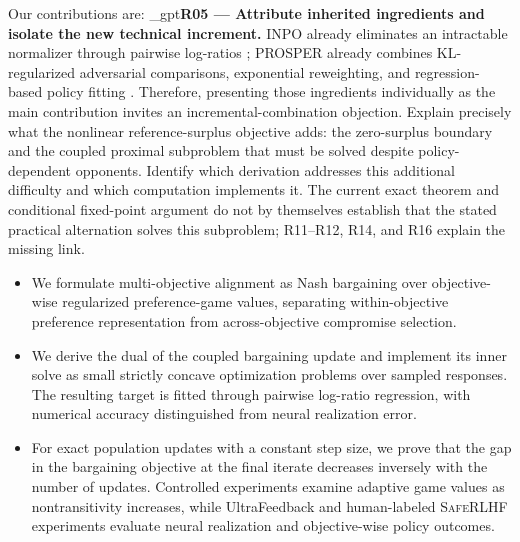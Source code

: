 \documentclass{article}
\newif\ifshowreviews
\newcommand{\reviewresponse}[1]{%
  \ifshowreviews
  \par\begingroup\color{blue!65!black}\hypersetup{allcolors=blue!65!black}\emergencystretch=2em%
  \noindent\textbf{Response:} #1\par\endgroup
  \fi}
\theoremstyle{remark}
\theoremstyle{plain}
\begin{document}
Our contributions are:
\kekim_gpt{\textbf{R05 --- Attribute inherited ingredients and isolate the new technical increment.} INPO already eliminates an intractable normalizer through pairwise log-ratios \citep{zhang2025iterative}; PROSPER already combines KL-regularized adversarial comparisons, exponential reweighting, and regression-based policy fitting \citep{zhang2026prosper}. Therefore, presenting those ingredients individually as the main contribution invites an incremental-combination objection. Explain precisely what the nonlinear reference-surplus objective adds: the zero-surplus boundary and the coupled proximal subproblem that must be solved despite policy-dependent opponents. Identify which derivation addresses this additional difficulty and which computation implements it. The current exact theorem and conditional fixed-point argument do not by themselves establish that the stated practical alternation solves this subproblem; R11--R12, R14, and R16 explain the missing link.}
\reviewresponse{\textbf{R05 --- Addressed in the formulation and attribution.} The introduction attributes pairwise log-ratio fitting to INPO and adversarial reweighting ingredients to PROSPER. The technical increment is the reference-surplus log objective and its coupled proximal dual. The practical procedure uses a finite-pool solve followed by a frozen-target neural fit; neither inherited ingredients nor accurate teacher residuals establish neural-policy convergence.}

\begin{itemize}
    \item We formulate multi-objective alignment as Nash bargaining over objective-wise regularized preference-game values, separating within-objective preference representation from across-objective compromise selection.
    \item We derive the dual of the coupled bargaining update and implement its inner solve as small strictly concave optimization problems over sampled responses. The resulting target is fitted through pairwise log-ratio regression, with numerical accuracy distinguished from neural realization error.
    \item For exact population updates with a constant step size, we prove that the gap in the bargaining objective at the final iterate decreases inversely with the number of updates. Controlled experiments examine adaptive game values as nontransitivity increases, while UltraFeedback and human-labeled \textsc{SafeRLHF} experiments evaluate neural realization and objective-wise policy outcomes.
\end{itemize}
\end{document}
